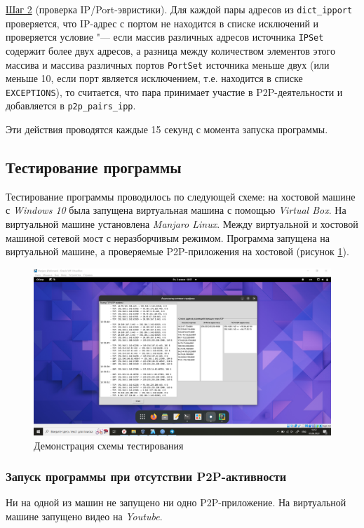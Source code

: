 \documentclass[bachelor, och, coursework]{SCWorks}
\begin{document}
\underline{Шаг 2} (проверка IP/Port-эвристики). 
Для каждой пары адресов из \texttt{dict_ipport} проверяется, что IP-адрес с портом не находится в списке исключений и проверяется условие "--- если массив различных адресов источника \texttt{IPSet} содержит более двух адресов, а разница между количеством элементов этого массива и массива различных портов \texttt{PortSet}
источника меньше двух (или меньше 10, если порт является исключением, т.е. находится в списке \texttt{EXCEPTIONS}), то считается, что пара принимает участие в P2P-деятельности и добавляется в \texttt{p2p_pairs_ipp}.

Эти действия проводятся каждые 15 секунд с момента запуска программы.

\subsection{Тестирование программы}
Тестирование программы проводилось по следующей схеме: на хостовой машине с \textit{Windows 10} была запущена виртуальная машина с помощью \textit{Virtual Box}. На виртуальной машине установлена \textit{Manjaro Linux}. Между виртуальной и хостовой машиной сетевой мост с неразборчивым режимом. Программа запущена на виртуальной машине, а проверяемые P2P-приложения на хостовой (рисунок \ref{test1}).

\begin{figure}[H]
    \centering
    \includegraphics[width=0.999\textwidth]{test1.png}
    \caption{Демонстрация схемы тестирования}
    \label{test1}
\end{figure}

\subsubsection{Запуск программы при отсутствии P2P-активности}
Ни на одной из машин не запущено ни одно P2P-приложение. На виртуальной машине запущено видео на \textit{Youtube}.
\end{document}
